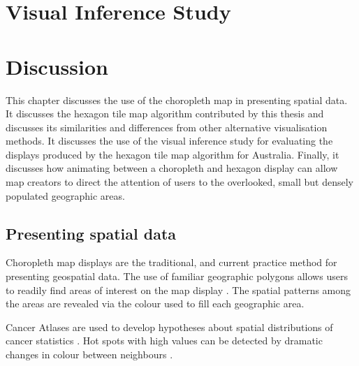\documentclass{monashthesis}
\begin{document}




\hypertarget{ch:experiment}{%
\chapter{Visual Inference Study}\label{ch:experiment}}





\hypertarget{ch:discussion}{%
\chapter{Discussion}\label{ch:discussion}}

This chapter discusses the use of the choropleth map in presenting spatial data.
It discusses the hexagon tile map algorithm contributed by this thesis and discusses its similarities and differences from other alternative visualisation methods.
It discusses the use of the visual inference study for evaluating the displays produced by the hexagon tile map algorithm for Australia. Finally, it discusses how animating between a choropleth and hexagon display can allow map creators to direct the attention of users to the overlooked, small but densely populated geographic areas.

\hypertarget{presenting-spatial-data}{%
\section{Presenting spatial data}\label{presenting-spatial-data}}

Choropleth map displays are the traditional, and current practice method for presenting geospatial data. The use of familiar geographic polygons allows users to readily find areas of interest on the map display \autocite{EI}. The spatial patterns among the areas are revealed via the colour used to fill each geographic area.

Cancer Atlases are used to develop hypotheses about spatial distributions of cancer statistics \autocite{CPISACA}. Hot spots with high values can be detected by dramatic changes in colour between neighbours \autocite{MACM}.
\end{document}
